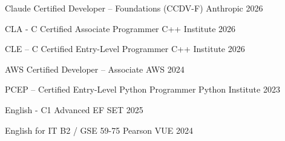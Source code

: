 
\begin{cvhonors}

	\cvhonor
	{Claude Certified Developer -- Foundations (CCDV-F)}
	{Anthropic}
	{}
	{2026}

	\cvhonor
	{CLA - C Certified Associate Programmer}
	{C++ Institute}
	{}
	{2026}

	\cvhonor
	{CLE – C Certified Entry-Level Programmer}
	{C++ Institute}
	{}
	{2026}

	\cvhonor
	{AWS Certified Developer – Associate}
	{AWS}
	{}
	{2024}

	\cvhonor
	{PCEP – Certified Entry-Level Python Programmer}
	{Python Institute}
	{}
	{2023}

	\cvhonor
	{English - C1 Advanced}
	{EF SET}
	{}
	{2025}

	\cvhonor
	{English for IT B2 / GSE 59-75}
	{Pearson VUE}
	{}
	{2024}

\end{cvhonors}


